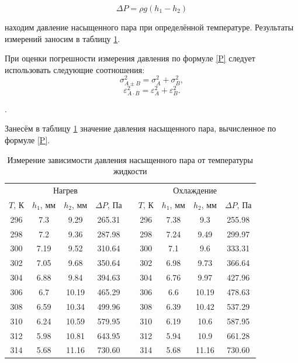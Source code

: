 \documentclass[a4paper, 12pt]{article}
\newcounter{Points}
\newcommand{\point}{\arabic{Points}. \addtocounter{Points}{1}}
\begin{document}
\begin{equation}\label{P}
    \Delta P = \rho g (h_1 - h_2)
\end{equation}  

находим давление насыщенного пара при определённой температуре. Результаты измерений заносим в таблицу \ref{tab:measures}.
    
При оценки погрешности измерения давления по формуле \eqref{P} следует использовать следующие соотношения:
\[ \sigma^2_{A\pm B} = \sigma^2_A+\sigma^2_B, \]
\[ \varepsilon^2_{A\cdot B} = \varepsilon^2_A+\varepsilon^2_B. \]
    
\point Занесём в таблицу \ref{tab:measures} значение давления насыщенного пара, вычисленное по формуле \eqref{P}.
    
\begin{table}[h]
    \centering
    \begin{tabular}{|c|c|c|c|c|c|c|c|c|}
        \cline{1-4} \cline{6-9}
        \multicolumn{4}{|c|}{Нагрев} &  & \multicolumn{4}{c|}{Охлаждение} \\ \cline{1-4} \cline{6-9}

        $ T $, К & $ h_1 $, мм & $ h_2 $, мм & $ \Delta P $, Па &  & $ T $, К & $ h_1 $, мм & $ h_2 $, мм & $ \Delta P $, Па \\ \cline{1-4} \cline{6-9} 
        296	& 7.3	& 9.29	& 265.31	& 	& 296	& 7.38	& 9.3	& 255.98	\\ \cline{1-4} \cline{6-9}
        298	& 7.2	& 9.36	& 287.98	& 	& 298	& 7.24	& 9.49	& 299.97	\\ \cline{1-4} \cline{6-9}
        300	& 7.19	& 9.52	& 310.64	& 	& 300	& 7.1	& 9.6	& 333.31	\\ \cline{1-4} \cline{6-9}
        302	& 7.05	& 9.68	& 350.64	& 	& 302	& 6.98	& 9.73	& 366.64	\\ \cline{1-4} \cline{6-9}
        304	& 6.88	& 9.84	& 394.63	& 	& 304	& 6.76	& 9.97	& 427.96	\\ \cline{1-4} \cline{6-9}
        306	& 6.7	& 10.19	& 465.29	& 	& 306	& 6.6	& 10.19	& 478.63	\\ \cline{1-4} \cline{6-9}
        308	& 6.59	& 10.34	& 499.96	& 	& 308	& 6.39	& 10.42	& 537.29	\\ \cline{1-4} \cline{6-9}
        310	& 6.24	& 10.59	& 579.95	& 	& 310	& 6.19	& 10.6	& 587.95	\\ \cline{1-4} \cline{6-9}
        312	& 5.98	& 10.81	& 643.95	& 	& 312	& 5.94	& 10.9	& 661.28	\\ \cline{1-4} \cline{6-9}
        314	& 5.68	& 11.16	& 730.60	& 	& 314	& 5.68	& 11.16	& 730.60	\\ \cline{1-4} \cline{6-9}
    \end{tabular}
    \caption{Измерение зависимости давления насыщенного пара от температуры жидкости}
    \label{tab:measures}
\end{table}
    
\end{document}
